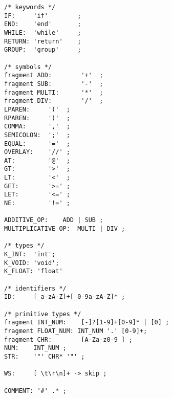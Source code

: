 \documentclass[11pt,letterpaper]{article}
\begin{document}
\begin{lstlisting}[tabsize=4]
/* keywords */
IF:     'if'        ;
END:    'end'       ;
WHILE:  'while'     ;
RETURN: 'return'    ;
GROUP:  'group'     ;

/* symbols */
fragment ADD:        '+'  ;
fragment SUB:        '-'  ;
fragment MULTI:      '*'  ;
fragment DIV:        '/'  ;
LPAREN:     '('  ;
RPAREN:     ')'  ;
COMMA:      ','  ;
SEMICOLON:  ';'  ;
EQUAL:      '='  ;
OVERLAY:    '//' ;
AT:         '@'  ;
GT:         '>'  ;
LT:         '<'  ;
GET:        '>=' ;
LET:        '<=' ;
NE:         '!=' ;

ADDITIVE_OP:    ADD | SUB ;
MULTIPLICATIVE_OP:  MULTI | DIV ;

/* types */
K_INT:  'int';
K_VOID: 'void';
K_FLOAT: 'float'

/* identifiers */
ID:     [_a-zA-Z]+[_0-9a-zA-Z]* ;   

/* primitive types */
fragment INT_NUM:    [-]?[1-9]+[0-9]* | [0] ;    
fragment FLOAT_NUM: INT_NUM '.' [0-9]+; 
fragment CHR:        [A-Za-z0-9_] ;
NUM:    INT_NUM ;
STR:    '"' CHR* '"' ;

WS:     [ \t\r\n]+ -> skip ;

COMMENT: '#' .* ;
\end{lstlisting}	
\end{document}

